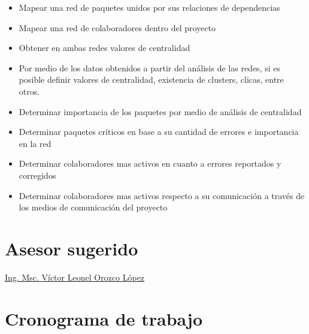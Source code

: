 \documentclass[letterpaper,12pt,titlepage]{report}
\begin{document}
\begin{itemize}
\item Mapear una red de paquetes unidos por sus relaciones de dependencias
\item Mapear una red de colaboradores dentro del proyecto
\item Obtener en ambas redes valores de centralidad
\item Por medio de los datos obtenidos a partir del análisis de las
  redes, si es posible definir valores de centralidad, existencia de
  clusters, clicas, entre otros.
\item Determinar importancia de los paquetes por medio de análisis de centralidad
\item Determinar paquetes críticos en base a su cantidad de errores e importancia en la red
\item Determinar colaboradores mas activos en cuanto a errores reportados y corregidos
\item Determinar colaboradores mas activos respecto a su comunicación
  a través de los medios de comunicación del proyecto
\end{itemize}

\chapter{Asesor sugerido}

\href{http://vorozco.com/cv/index-es.html}{Ing.  Msc.  Víctor Leonel
  Orozco López}


\chapter{Cronograma de trabajo}
%






{} 
\end{document}
